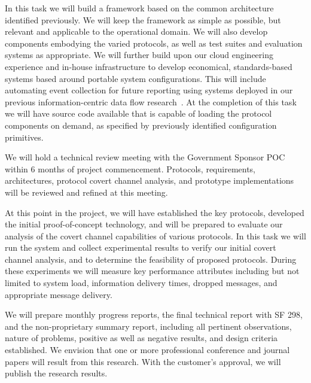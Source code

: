 \documentclass{sbir}
\begin{document}
In this task we will build a framework based on the common architecture identified previously. We will keep the framework as simple as possible, but relevant and applicable to the operational domain. We will also develop components embodying the varied protocols, as well as test suites and evaluation systems as appropriate. We will further build upon our cloud engineering experience and in-house infrastructure to develop economical, standards-based systems based around portable system configurations. This will include automating event collection for future reporting using systems deployed in our previous information-centric data flow research~\cite{LaHe:12b}. 
At the completion of this task we will have source code available that is capable of loading the protocol components on demand, as specified by previously identified configuration primitives.

We will hold a technical review meeting with the Government Sponsor POC within 6 months of project commencement. Protocols, requirements, architectures, protocol covert channel analysis, and prototype implementations will be reviewed and refined at this meeting.

At this point in the project, we will have established the key protocols, developed the initial proof-of-concept technology, and will be prepared to evaluate our analysis of the covert channel capabilities of various protocols. In this task we will run the system and collect experimental results to verify our initial covert channel analysis, and to determine the feasibility of proposed protocols. During these experiments we will measure key performance attributes including but not limited to system load, information delivery times, dropped messages, and appropriate message delivery.

We will prepare monthly progress reports, the final technical report with SF 298, and the non-proprietary summary report, including all pertinent observations, nature of problems, positive as well as negative results, and design criteria established. We envision that one or more professional conference and journal papers will result from this research. With the customer's approval, we will publish the research results.
\end{document}
